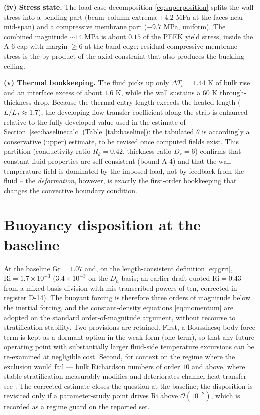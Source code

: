\textbf{(iv) Stress state.} The load-case decomposition \eqref{eq:superposition} splits the wall
stress into a bending part (beam--column extrema $\pm4.2$ MPa at the faces near mid-span) and a
compressive membrane part ($-9.7$ MPa, uniform). The combined magnitude $\sim14$ MPa is about
$0.15$ of the PEEK yield stress, inside the A-6 cap with margin $\ge6$ at the band edge; residual
compressive membrane stress is the by-product of the axial constraint that also produces the
buckling ceiling.

\textbf{(v) Thermal bookkeeping.} The fluid picks up only $\Delta T_b=1.44$ K of bulk rise and an
interface excess of about $1.6$ K, while the wall sustains a 60 K through-thickness drop.
Because the thermal entry length exceeds the heated length ($L/L_T\approx1.7$), the
developing-flow transfer coefficient along the strip is enhanced relative to the fully developed
value used in the estimate of Section~\ref{sec:baselinecalc} (Table~\ref{tab:baseline}):
the tabulated $\bar\theta$ is accordingly a conservative (upper) estimate, to be revised once
computed fields exist. This
partition (conductivity ratio $R_k=0.42$, thickness ratio $D_r=6$) confirms that constant fluid
properties are self-consistent (bound A-4) and that the wall temperature field is dominated by the
imposed load, not by feedback from the fluid -- the \emph{deformation}, however, is exactly the
first-order bookkeeping that changes the convective boundary condition.

\section{Buoyancy disposition at the baseline}
\label{sec:buoyancy-baseline}
At the baseline $\mathrm{Gr}=1.07$ and, on the length-consistent definition \eqref{eq:grri},
$\mathrm{Ri}=1.7\times10^{-3}$ ($3.4\times10^{-3}$ on the $D_h$ basis; an earlier draft quoted
$\mathrm{Ri}=0.43$ from a mixed-basis division with mis-transcribed powers of ten, corrected in
register D-14). The buoyant forcing is therefore three orders of magnitude below the inertial
forcing, and the constant-density equations \eqref{eq:momentum} are adopted on the standard
order-of-magnitude argument, without recourse to stratification stability. Two provisions are
retained. First, a Boussinesq body-force term is kept as a dormant option in the weak form (one
term), so that any future operating point with substantially larger fluid-side temperature
excursions can be re-examined at negligible cost. Second, for context on the regime where the
exclusion would fail --- bulk Richardson numbers of order $10$ and above, where stable
stratification measurably modifies and deteriorates channel heat transfer --- see
\cite{draskic2025stability}. The corrected estimate closes the question at the baseline; the
disposition is revisited only if a parameter-study point drives Ri above $\mathcal{O}(10^{-2})$,
which is recorded as a regime guard on the reported set.
